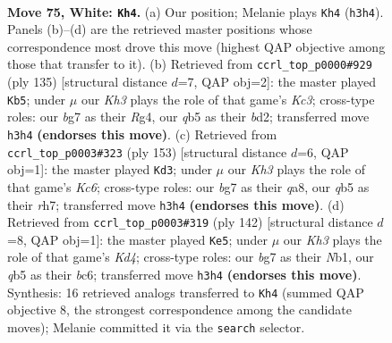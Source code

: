 \documentclass[11pt]{article}
\begin{document}
\clearpage

\begin{figure}[p]\centering
\begin{subfigure}{0.46\textwidth}\centering
\resizebox{\linewidth}{!}{%
\newchessgame
\chessboard[
  setfen={8/2k3b1/8/1q3p2/8/7K/8/8 w - - 0 75},
  showmover=false,
  pgfstyle=straightmove, color=movearrow, markmove={h3-h4}
]}
\caption{}
\end{subfigure}\hfill
\begin{subfigure}{0.46\textwidth}\centering
\resizebox{\linewidth}{!}{%
\newchessgame
\chessboard[
  setfen={8/8/2k5/P7/6r1/1K6/3B4/8 b - - 0 68},
  showmover=false,
  pgfstyle=straightmove, color=movearrow, markmove={c6-b5}
]}
\caption{}
\end{subfigure}
\\[4pt]
\begin{subfigure}{0.46\textwidth}\centering
\resizebox{\linewidth}{!}{%
\newchessgame
\chessboard[
  setfen={Q7/4P2R/8/5K2/8/2k5/8/8 b - - 0 77},
  showmover=false,
  pgfstyle=straightmove, color=movearrow, markmove={c3-d3}
]}
\caption{}
\end{subfigure}\hfill
\begin{subfigure}{0.46\textwidth}\centering
\resizebox{\linewidth}{!}{%
\newchessgame
\chessboard[
  setfen={8/5k2/1pb5/p7/3K4/8/8/1N6 w - - 4 72},
  showmover=false,
  pgfstyle=straightmove, color=movearrow, markmove={d4-e5}
]}
\caption{}
\end{subfigure}
\caption{\textbf{Move 75, White: \texttt{Kh4}.} (a) Our position; Melanie plays \texttt{Kh4} (\texttt{h3h4}). Panels (b)--(d) are the retrieved master positions whose correspondence most drove this move (highest QAP objective among those that transfer to it). (b) Retrieved from \texttt{ccrl\_top\_p0000\#929} (ply 135) [structural distance $d$=7, QAP obj=2]: the master played \texttt{Kb5}; under $\mu$ our \emph{Kh3} plays the role of that game's \emph{Kc3}; cross-type roles: our \emph{b}g7 as their \emph{R}g4, our \emph{q}b5 as their \emph{b}d2; transferred move \texttt{h3h4} \textbf{(endorses this move)}. (c) Retrieved from \texttt{ccrl\_top\_p0003\#323} (ply 153) [structural distance $d$=6, QAP obj=1]: the master played \texttt{Kd3}; under $\mu$ our \emph{Kh3} plays the role of that game's \emph{Kc6}; cross-type roles: our \emph{b}g7 as their \emph{q}a8, our \emph{q}b5 as their \emph{r}h7; transferred move \texttt{h3h4} \textbf{(endorses this move)}. (d) Retrieved from \texttt{ccrl\_top\_p0003\#319} (ply 142) [structural distance $d$=8, QAP obj=1]: the master played \texttt{Ke5}; under $\mu$ our \emph{Kh3} plays the role of that game's \emph{Kd4}; cross-type roles: our \emph{b}g7 as their \emph{N}b1, our \emph{q}b5 as their \emph{b}c6; transferred move \texttt{h3h4} \textbf{(endorses this move)}. Synthesis: 16 retrieved analogs transferred to \texttt{Kh4} (summed QAP objective 8, the strongest correspondence among the candidate moves); Melanie committed it via the \texttt{search} selector.}
\label{fig:thought-m148}
\end{figure}
\end{document}
